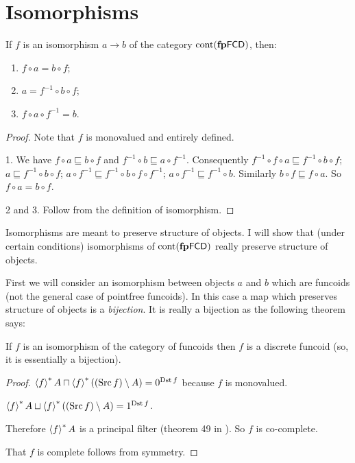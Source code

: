 \section{Isomorphisms}

\begin{thm}
  If $f$ is an isomorphism $a \rightarrow b$ of the category
  $\operatorname{cont} (\mathbf{fp}
  \mathsf{FCD})$, then:
  \begin{enumerate}
    \item $f \circ a = b \circ f$;
    
    \item $a = f^{- 1} \circ b \circ f$;
    
    \item $f \circ a \circ f^{- 1} = b$.
  \end{enumerate}
\end{thm}

\begin{proof}
  Note that $f$ is monovalued and entirely defined.
  
  1. We have $f \circ a \sqsubseteq b \circ f$ and $f^{- 1} \circ b
  \sqsubseteq a \circ f^{- 1}$. Consequently $f^{- 1} \circ f \circ a
  \sqsubseteq f^{- 1} \circ b \circ f$; $a \sqsubseteq f^{- 1} \circ b \circ
  f$; $a \circ f^{- 1} \sqsubseteq f^{- 1} \circ b \circ f \circ f^{- 1}$; $a
  \circ f^{- 1} \sqsubseteq f^{- 1} \circ b$. Similarly $b \circ f \sqsubseteq
  f \circ a$. So $f \circ a = b \circ f$.
  
  2 and 3. Follow from the definition of isomorphism.
\end{proof}

Isomorphisms are meant to preserve structure of objects. I will show that
(under certain conditions) isomorphisms of $\operatorname{cont}
(\mathbf{fp} \mathsf{FCD})$ really preserve
structure of objects.

First we will consider an isomorphism between objects $a$ and $b$ which are
funcoids (not the general case of pointfree funcoids). In this case a map
which preserves structure of objects is a \emph{bijection}. It is really a
bijection as the following theorem says:

\begin{thm}
If $f$ is an isomorphism of the category of funcoids then $f$ is a discrete
funcoid (so, it is essentially a bijection).
\end{thm}

\begin{proof}
  $\left\langle f\right\rangle^{\ast} A \sqcap \left\langle f\right\rangle^{\ast} ((\operatorname{Src} f)
  \setminus A) = 0^{\operatorname{Dst} f}$ because $f$ is monovalued.
  
  $\left\langle f\right\rangle^{\ast} A \sqcup \left\langle f\right\rangle^{\ast} ((\operatorname{Src} f)
  \setminus A) = 1^{\operatorname{Dst} f}$.
  
  Therefore $\left\langle f\right\rangle^{\ast} A$ is a principal filter (theorem 49 in
  {\cite{filters}}). So $f$ is co-complete.
  
  That $f$ is complete follows from symmetry.
\end{proof}

